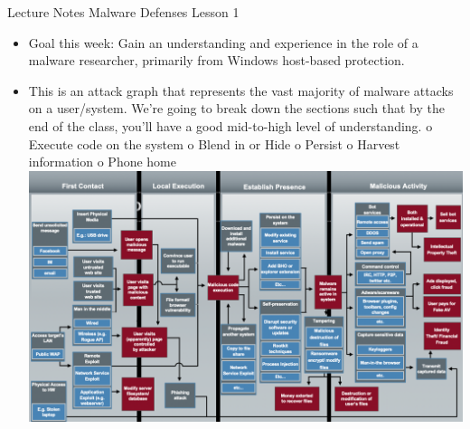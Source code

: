 \documentclass[12pt]{article}
\begin{document}
\newpage
Lecture Notes
\newline
Malware Defenses Lesson 1
\begin{itemize}
\item	Goal this week: Gain an understanding and experience in the role of a malware researcher, primarily from Windows host-based protection.
\item	This is an attack graph that represents the vast majority of malware attacks on a user/system.  We’re going to break down the sections such that by the end of the class, you’ll have a good mid-to-high level of understanding.
o	Execute code on the system
o	Blend in or Hide
o	Persist
o	Harvest information
o	Phone home
\includegraphics{Picture1.png}


\end{itemize}
\end{document}
